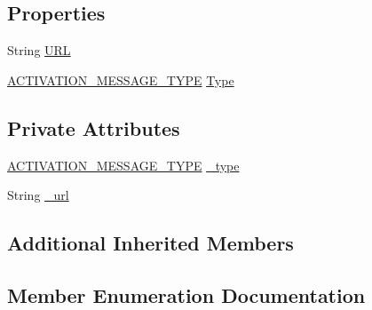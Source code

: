 \subsection*{Properties}
\begin{DoxyCompactItemize}
\item 
String \hyperlink{class_web_analyzer_1_1_models_1_1_message_model_1_1_activation_message_a4df0cf1fbf60a7211a5ee55831adcb9e}{U\+R\+L}
\item 
\hyperlink{class_web_analyzer_1_1_models_1_1_message_model_1_1_activation_message_ad3b5847039dd26527a842c6f7675b1b2}{A\+C\+T\+I\+V\+A\+T\+I\+O\+N\+\_\+\+M\+E\+S\+S\+A\+G\+E\+\_\+\+T\+Y\+P\+E} \hyperlink{class_web_analyzer_1_1_models_1_1_message_model_1_1_activation_message_a0f68201fb8faad6d3a2a074bc7670313}{Type}
\end{DoxyCompactItemize}
\subsection*{Private Attributes}
\begin{DoxyCompactItemize}
\item 
\hyperlink{class_web_analyzer_1_1_models_1_1_message_model_1_1_activation_message_ad3b5847039dd26527a842c6f7675b1b2}{A\+C\+T\+I\+V\+A\+T\+I\+O\+N\+\_\+\+M\+E\+S\+S\+A\+G\+E\+\_\+\+T\+Y\+P\+E} \hyperlink{class_web_analyzer_1_1_models_1_1_message_model_1_1_activation_message_a108e256eff9daab288b9c8c8f18d9792}{\+\_\+type}
\item 
String \hyperlink{class_web_analyzer_1_1_models_1_1_message_model_1_1_activation_message_a7d5933c3187edc115317483ad31df6b4}{\+\_\+url}
\end{DoxyCompactItemize}
\subsection*{Additional Inherited Members}


\subsection{Member Enumeration Documentation}
\hypertarget{class_web_analyzer_1_1_models_1_1_message_model_1_1_activation_message_ad3b5847039dd26527a842c6f7675b1b2}{}
